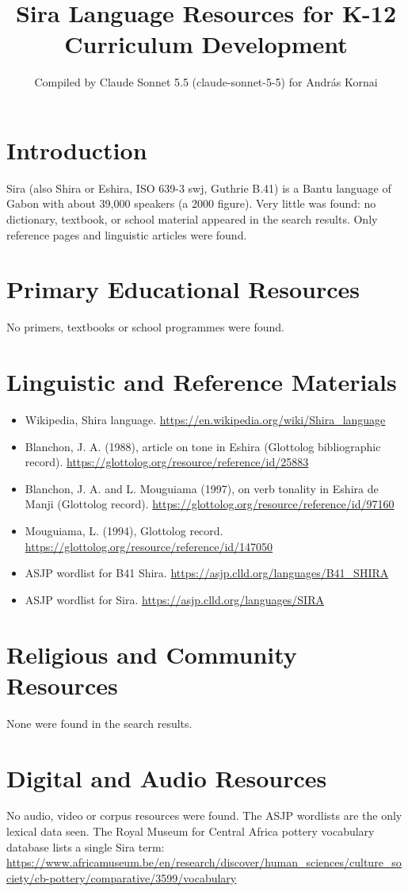 \documentclass[12pt]{article}
\title{Sira Language Resources for K-12 Curriculum Development}
\author{Compiled by Claude Sonnet 5.5 (claude-sonnet-5-5) for Andr\'as Kornai}
\date{}
\begin{document}
\maketitle

\section{Introduction}
Sira (also Shira or Eshira, ISO 639-3 swj, Guthrie B.41) is a Bantu language of Gabon with about 39,000 speakers (a 2000 figure). Very little was found: no dictionary, textbook, or school material appeared in the search results. Only reference pages and linguistic articles were found.

\section{Primary Educational Resources}
No primers, textbooks or school programmes were found.

\section{Linguistic and Reference Materials}
\begin{itemize}
\item Wikipedia, Shira language. \url{https://en.wikipedia.org/wiki/Shira_language}
\item Blanchon, J. A. (1988), article on tone in Eshira (Glottolog bibliographic record). \url{https://glottolog.org/resource/reference/id/25883}
\item Blanchon, J. A. and L. Mouguiama (1997), on verb tonality in Eshira de Manji (Glottolog record). \url{https://glottolog.org/resource/reference/id/97160}
\item Mouguiama, L. (1994), Glottolog record. \url{https://glottolog.org/resource/reference/id/147050}
\item ASJP wordlist for B41 Shira. \url{https://asjp.clld.org/languages/B41_SHIRA}
\item ASJP wordlist for Sira. \url{https://asjp.clld.org/languages/SIRA}
\end{itemize}

\section{Religious and Community Resources}
None were found in the search results.

\section{Digital and Audio Resources}
No audio, video or corpus resources were found. The ASJP wordlists are the only lexical data seen. The Royal Museum for Central Africa pottery vocabulary database lists a single Sira term: \url{https://www.africamuseum.be/en/research/discover/human_sciences/culture_society/cb-pottery/comparative/3599/vocabulary}
\end{document}
